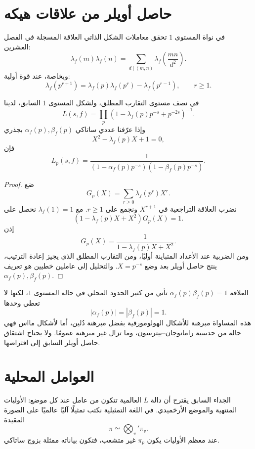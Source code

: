 \section{حاصل أويلر من علاقات هيكه}

في نواة المستوى \(1\) تحقق معاملات الشكل الذاتي العلاقة المسجلة في
الفصل العشرين:
\[
\lambda_f(m)\lambda_f(n)
=
\sum_{d\mid(m,n)}
\lambda_f\!\left(\frac{mn}{d^2}\right).
\]
وبخاصة، عند قوة أولية:
\[
\lambda_f(p^{r+1})
=
\lambda_f(p)\lambda_f(p^r)-\lambda_f(p^{r-1}),
\qquad r\ge1.
\]

\begin{proposition}
\label{prop:ch21-euler-product}
\provedhere
في نصف مستوى التقارب المطلق، ولشكل المستوى \(1\) السابق، لدينا
\[
L(s,f)
=
\prod_p
\left(1-\lambda_f(p)p^{-s}+p^{-2s}\right)^{-1}.
\]
وإذا عرّفنا عددي ساتاكي \(\alpha_f(p),\beta_f(p)\) بجذري
\[
X^2-\lambda_f(p)X+1=0,
\]
فإن
\[
L_p(s,f)
=
\frac{1}{(1-\alpha_f(p)p^{-s})(1-\beta_f(p)p^{-s})}.
\]
\end{proposition}

\begin{proof}
ضع
\[
G_p(X)=\sum_{r\ge0}\lambda_f(p^r)X^r.
\]
نضرب العلاقة التراجعية في \(X^{r+1}\) ونجمع على \(r\ge1\). مع
\(\lambda_f(1)=1\) نحصل على
\[
(1-\lambda_f(p)X+X^2)G_p(X)=1.
\]
إذن
\[
G_p(X)=\frac1{1-\lambda_f(p)X+X^2}.
\]
ومن الضربية عند الأعداد المتباينة أوليًا، ومن التقارب المطلق الذي يجيز
إعادة الترتيب، ينتج حاصل أويلر بعد وضع \(X=p^{-s}\). والتحليل إلى
عاملين خطيين هو تعريف \(\alpha_f(p),\beta_f(p)\).
\end{proof}

\begin{remark}
العلاقة \(\alpha_f(p)\beta_f(p)=1\) تأتي من كثير الحدود المحلي في حالة
المستوى \(1\)، لكنها لا تعطي وحدها
\[
|\alpha_f(p)|=|\beta_f(p)|=1.
\]
هذه المساواة مبرهنة للأشكال الهولومورفية بفضل مبرهنة دُلين، أما لأشكال
مااس فهي حالة من حدسية رامانوجان--بيترسون، وما تزال غير مبرهنة عمومًا.
ولا يحتاج اشتقاق حاصل أويلر السابق إلى افتراضها.
\end{remark}

\section{العوامل المحلية}

الجداء السابق يقترح أن دالة \(L\) العالمية تتكون من عامل عند كل موضع:
الأوليات المنتهية والموضع الأرخميدي. في اللغة التمثيلية نكتب تمثيلًا
آليًا عالميًا على الصورة المقيدة
\[
\pi\simeq\bigotimes_v'\pi_v.
\]
عند معظم الأوليات يكون \(\pi_p\) غير متشعب، فتكون بياناته ممثلة بزوج
ساتاكي.

